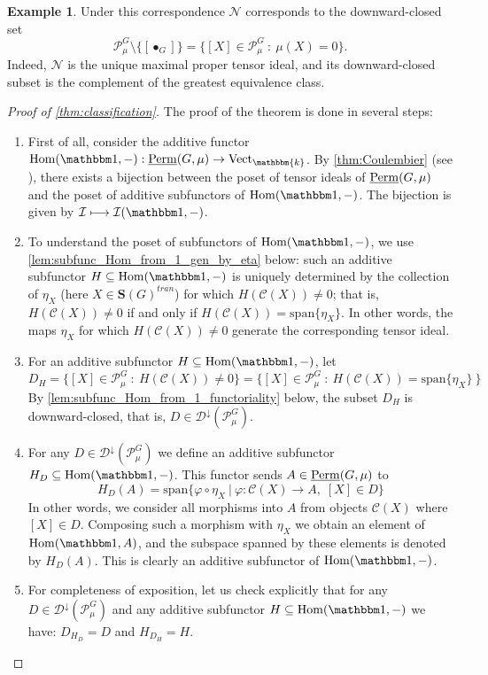 \documentclass[11pt,a4paper]{amsart}
\theoremstyle{plain}%
\theoremstyle{definition}
\newtheorem{example}[lemma]{Example}
\theoremstyle{remark}
\newcommand{\Hom}{\operatorname{Hom}}
\newcommand{\triv}{{\mathbbm 1}}
\newcommand{\Span}{\mathrm{span}}
\newcommand{\Perm}{\underline{{\rm Perm}}}
\newcommand{\kk}{\mathbbm{k}}
\newcommand{\Vect}{\mathrm{Vect}_{\kk}}
\newcommand{\Down}{\mathcal{D}^{\downarrow}}
\begin{document}
\begin{example}\label{ex:negligible} Under this correspondence $\mathcal{N}$ corresponds to the downward-closed set $$\mathcal{P}^G_\mu\setminus\{[\bullet_G]\}=\{[X]\in \mathcal{P}^G_{\mu} ~:~\mu(X)=0\}.$$
 Indeed, $\mathcal{N}$ is the unique maximal proper tensor ideal, and its downward-closed subset is the complement of the greatest equivalence class. 
\end{example}

\begin{proof}[Proof of \cref{thm:classification}]
    The proof of the theorem is done in several steps:
    \begin{enumerate}[itemindent=0pt,leftmargin=*]
        \item First of all, consider the additive functor $\Hom(\triv, -): \Perm(G, \mu)\to \Vect$.  By \cref{thm:Coulembier} (see \cite[Theorem 3.1.1]{Coulembier-ideals}), there exists a bijection between the poset of tensor ideals of $\Perm(G, \mu)$ and the poset of additive subfunctors of $\Hom(\triv, -)$. The bijection is given by $\mathcal{I} \longmapsto \mathcal{I}(\triv, -)$.
        \item To understand the poset of subfunctors of $\Hom(\triv, -)$, we use \cref{lem:subfunc_Hom_from_1_gen_by_eta} below: such an additive subfunctor $H\subseteq \Hom(\triv, -)$ is uniquely determined by the collection of $\eta_X$ (here $X\in \mathbf{S}(G)^{tran}$) for which $H(\mathcal{C}(X))\neq 0$; that is, $H(\mathcal{C}(X))\neq 0$ if and only if $H(\mathcal{C}(X))=\Span\{\eta_X\}$. 
        In other words, the maps $\eta_X$ for which $H(\mathcal{C}(X))\neq 0$ generate the corresponding tensor ideal.
        \item For an additive subfunctor $H\subseteq \Hom(\triv, -)$, let $$D_{H}=\{[X]\in \mathcal{P}^G_\mu~: ~H(\mathcal{C}(X))\neq 0\} = \{[X]\in \mathcal{P}^G_\mu~: ~H(\mathcal{C}(X)) =\Span\{\eta_X\}~ \} $$ By \cref{lem:subfunc_Hom_from_1_functoriality} below, the subset $D_{H}$ is downward-closed, that is, $D\in \Down(\mathcal{P}^G_\mu)$.
        \item For any $D\in \Down(\mathcal{P}^G_\mu)$ we define an additive subfunctor $H_D\subseteq \Hom(\triv, -)$. This functor sends $A\in \Perm(G, \mu)$ to $$H_D(A)=\Span\{\varphi\circ \eta_X~|~ \varphi:\mathcal{C}(X) \rightarrow A,\; [X]\in D  \}$$
        In other words, we consider all morphisms into $A$ from objects $\mathcal{C}(X)$ where $[X]\in D$. Composing such a morphism with $\eta_X$ we obtain an element of $\Hom(\triv, A)$, and the subspace spanned by these elements is denoted by $H_D(A)$. This is clearly an additive subfunctor of $\Hom(\triv, -)$.
        \item For completeness of exposition, let us check explicitly that for any $D\in \Down(\mathcal{P}^G_\mu)$ and any additive subfunctor $H \subseteq \Hom(\triv, -)$ we have: $D_{H_D}=D$ and $H_{D_H}{=} H$. 
        

\end{enumerate}
\end{proof}
\end{document}
